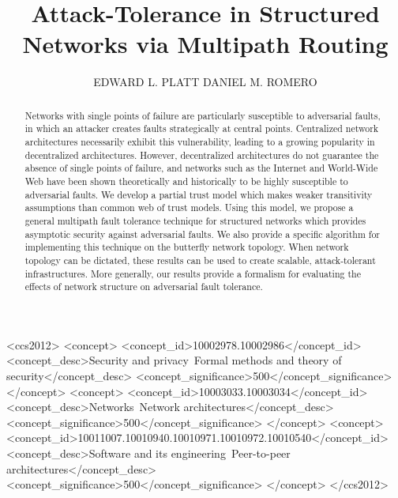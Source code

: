 \documentclass[prodmode,permissions]{acmsmall-ec16}
\begin{document}

\title{
Attack-Tolerance in Structured Networks via Multipath Routing
}
\author{EDWARD L. PLATT
DANIEL M. ROMERO
}

\begin{abstract}
Networks with single points of failure are particularly susceptible
to adversarial faults,
in which an attacker creates faults strategically at central points.
Centralized network architectures necessarily exhibit this vulnerability,
leading to a growing popularity in decentralized architectures.
However, decentralized architectures do not guarantee the absence of single
points of failure, and networks such as the Internet and World-Wide Web have
been shown theoretically and historically to be highly susceptible to
adversarial faults.
We develop a partial trust model which makes weaker transitivity
assumptions than common web of trust models.
Using this model, we propose a general multipath fault tolerance technique for
structured networks which
provides asymptotic security against adversarial faults.
We also provide a specific algorithm for implementing this technique on the
butterfly network topology.
When network topology can be dictated, these results can be used to create scalable, attack-tolerant infrastructures.
More generally, our results provide a formalism for evaluating the effects
of network structure on adversarial fault tolerance.
\end{abstract}


\begin{CCSXML}
<ccs2012>
<concept>
<concept_id>10002978.10002986</concept_id>
<concept_desc>Security and privacy~Formal methods and theory of security</concept_desc>
<concept_significance>500</concept_significance>
</concept>
<concept>
<concept_id>10003033.10003034</concept_id>
<concept_desc>Networks~Network architectures</concept_desc>
<concept_significance>500</concept_significance>
</concept>
<concept>
<concept_id>10011007.10010940.10010971.10010972.10010540</concept_id>
<concept_desc>Software and its engineering~Peer-to-peer architectures</concept_desc>
<concept_significance>500</concept_significance>
</concept>
</ccs2012>
\end{CCSXML}
\end{document}
